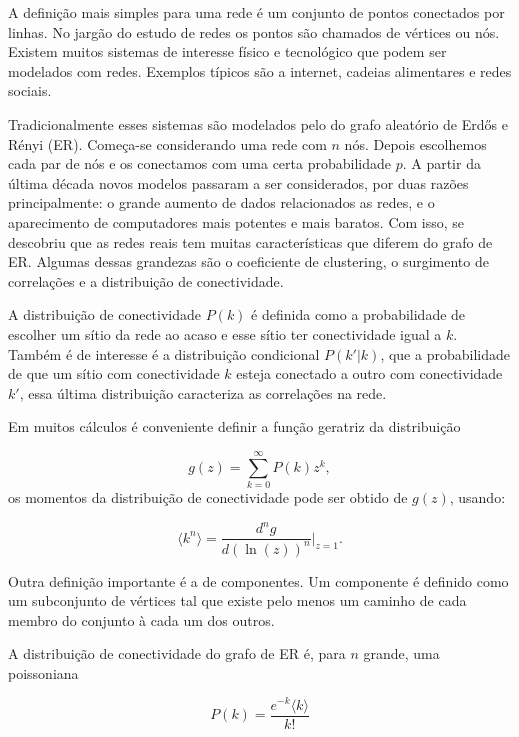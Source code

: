 \documentclass[a4paper,11pt]{report}
\begin{document}
A defini\c{c}\~ao mais simples para uma rede \'e um conjunto de pontos conectados por linhas. No jarg\~ao do estudo de redes os pontos s\~ao chamados de v\'ertices ou n\'os. Existem muitos sistemas de interesse f\'isico e tecnol\'ogico que podem ser modelados com redes. Exemplos t\'ipicos s\~ao a internet, cadeias alimentares e redes sociais.

Tradicionalmente esses sistemas s\~ao modelados pelo do grafo aleat\'orio de Erd\H{o}s e R\'enyi (ER). Come\c{c}a-se considerando uma rede com $n$ n\'os. Depois escolhemos cada par de n\'os e os conectamos com uma certa probabilidade $p$. A partir da \'ultima d\'ecada novos modelos passaram a ser considerados, por duas raz\~oes principalmente: o grande aumento de dados relacionados as redes, e o aparecimento de computadores mais potentes e mais baratos. Com isso, se descobriu que as redes reais tem muitas caracter\'isticas que diferem do grafo de ER. Algumas dessas grandezas s\~ao o coeficiente de clustering, o surgimento de correla\c{c}\~oes e a distribui\c{c}\~ao de conectividade.

A distribui\c{c}\~ao de conectividade $P(k)$ \'e definida como a probabilidade de escolher um s\'itio da rede ao acaso e esse s\'itio ter conectividade igual a $k$. Tamb\'em \'e de interesse \'e a distribui\c{c}\~ao condicional $P(k'|k)$, que a probabilidade de que um s\'itio com conectividade $k$ esteja conectado a outro com conectividade $k'$, essa \'ultima distribui\c{c}\~ao caracteriza as correla\c{c}\~oes na rede. 

Em muitos c\'alculos \'e conveniente definir a fun\c{c}\~ao geratriz da distribui\c{c}\~ao

\begin{equation}
g(z)=\sum_{k=0}^{\infty}P(k)z^{k},
\label{eq:geratriz}
\end{equation}
os momentos da distribui\c{c}\~ao de conectividade pode ser obtido de $g(z)$, usando:

\begin{equation}
\langle k^n\rangle=\frac{d^n g}{d(\ln(z))^n}\Bigg|_{z=1}.
\end{equation}

Outra defini\c{c}\~ao importante \'e a de componentes. Um componente \'e definido como um subconjunto de v\'ertices tal que existe pelo menos um caminho de cada membro do conjunto \`a cada um dos outros. 

A distribui\c{c}\~ao de conectividade do grafo de ER \'e, para $n$ grande, uma poissoniana

\begin{equation}
P(k)=\frac{e^{-k}\langle k\rangle}{k!}
\label{eq:dist-ER}
\end{equation}
\end{document}
